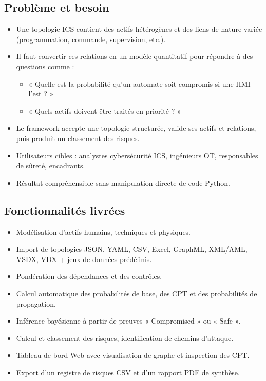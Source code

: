 \documentclass[12pt,a4paper]{article}
\newcommand{\forcereset}[1]{%
    \needspace{#1\baselineskip}%
}
\begin{document}
\subsection{Problème et besoin}
\forcereset{5}
\begin{itemize}[leftmargin=1.2cm, itemsep=0.2\baselineskip]
    \item Une topologie ICS contient des actifs hétérogènes et des liens de nature variée (programmation, commande, supervision, etc.).
    \item Il faut convertir ces relations en un modèle quantitatif pour répondre à des questions comme :
        \begin{itemize}
            \item « Quelle est la probabilité qu'un automate soit compromis si une HMI l'est ? »
            \item « Quels actifs doivent être traités en priorité ? »
        \end{itemize}
    \item Le framework accepte une topologie structurée, valide ses actifs et relations, puis produit un classement des risques.
    \item Utilisateurs cibles : analystes cybersécurité ICS, ingénieurs OT, responsables de sûreté, encadrants.
    \item Résultat compréhensible sans manipulation directe de code Python.
\end{itemize}

\subsection{Fonctionnalités livrées}
\forcereset{5}
\begin{contributionbox}
\begin{itemize}[leftmargin=1.2cm, itemsep=0.2\baselineskip, topsep=2pt]
    \item Modélisation d'actifs humains, techniques et physiques.
    \item Import de topologies JSON, YAML, CSV, Excel, GraphML, XML/AML, VSDX, VDX + jeux de données prédéfinis.
    \item Pondération des dépendances et des contrôles.
    \item Calcul automatique des probabilités de base, des CPT et des probabilités de propagation.
    \item Inférence bayésienne à partir de preuves « Compromised » ou « Safe ».
    \item Calcul et classement des risques, identification de chemins d'attaque.
    \item Tableau de bord Web avec visualisation de graphe et inspection des CPT.
    \item Export d'un registre de risques CSV et d'un rapport PDF de synthèse.
\end{itemize}
\end{contributionbox}
\end{document}

